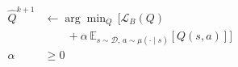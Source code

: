 \documentclass[border=7pt]{standalone}
\begin{document}
\color{ink}
$\displaystyle \begin{aligned} \widehat Q^{k+1}&\leftarrow\arg\min_Q\,\big[\mathcal L_B(Q)\\ &\qquad+\alpha\,\mathbb E_{s\sim\mathcal D,\,a\sim\mu(\cdot\mid s)}[Q(s,a)]\big]\\ \alpha&\geq0\end{aligned}$
\end{document}
